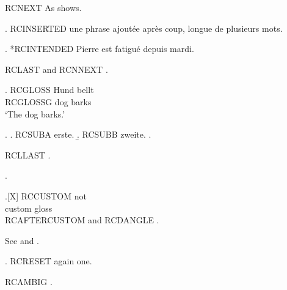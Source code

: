 
\exrefcheck
RCNEXT As \Next shows.

\ex. \label{ex:ins} RCINSERTED une phrase ajoutée après coup, longue de plusieurs mots.

\ex. *RCINTENDED Pierre est fatigué depuis mardi.

RCLAST \Last and RCNNEXT \NNext.

\exg. RCGLOSS Hund bellt\\
RCGLOSSG dog barks\\
`The dog barks.'

\ex. \a. RCSUBA \label{ex:sub}erste.
\b. RCSUBB zweite.
\z.

RCLLAST \LLast.

\ex. \strut

\ex.[X] \gll RCCUSTOM not\\ custom gloss\\

RCAFTERCUSTOM \Last and RCDANGLE \NNext.

See  and .

\setcounter{ExNo}{0}
\ex. RCRESET again one.

RCAMBIG \Last.

